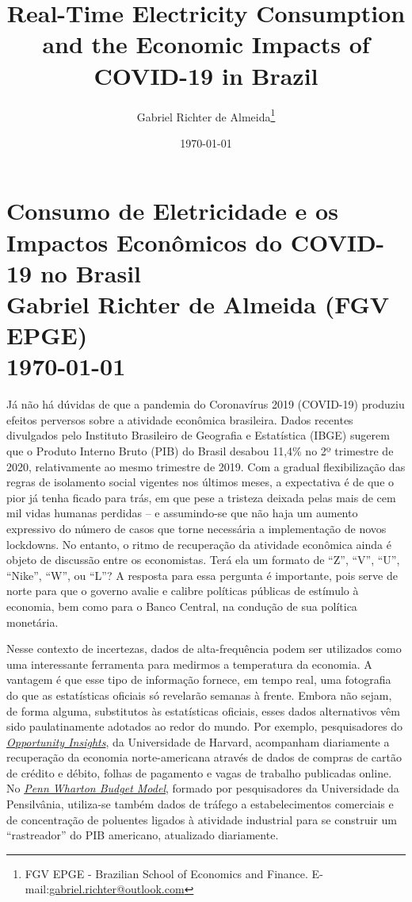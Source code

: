 \documentclass[12pt]{article}
\title{Real-Time Electricity Consumption and the Economic Impacts of COVID-19 in Brazil}
\author{Gabriel Richter de Almeida\footnote{FGV EPGE - Brazilian School of Economics and Finance. E-mail:\href{mailto:gabriel.richter@outlook.com}{gabriel.richter@outlook.com}}}
\date{\today}
\begin{document}
	
\section*{\normalsize Consumo de Eletricidade e os Impactos Econômicos do COVID-19 no Brasil \\	Gabriel Richter de Almeida (FGV EPGE) \\ \today}
	
Já não há dúvidas de que a pandemia do Coronavírus 2019 (COVID-19) produziu efeitos perversos sobre a atividade econômica brasileira. Dados recentes divulgados pelo Instituto Brasileiro de Geografia e Estatística (IBGE) sugerem que o Produto Interno Bruto (PIB) do Brasil desabou 11,4\% no 2º trimestre de 2020, relativamente ao mesmo trimestre de 2019. Com a gradual flexibilização das regras de isolamento social vigentes nos últimos meses, a expectativa é de que o pior já tenha ficado para trás, em que pese a tristeza deixada pelas mais de cem mil vidas humanas perdidas -- e assumindo-se que não haja um aumento expressivo do número de casos que torne necessária a implementação de novos lockdowns. No entanto, o ritmo de recuperação da atividade econômica ainda é objeto de discussão entre os economistas. Terá ela um formato de “Z”, “V”, “U”, “Nike”, “W”, ou “L”? A resposta para essa pergunta é importante, pois serve de norte para que o governo avalie e calibre políticas públicas de estímulo à economia, bem como para o Banco Central, na condução de sua política monetária.
	
Nesse contexto de incertezas, dados de alta-frequência podem ser utilizados como uma interessante ferramenta para medirmos a temperatura da economia. A vantagem é que esse tipo de informação fornece, em tempo real, uma fotografia do que as estatísticas oficiais só revelarão semanas à frente. Embora não sejam, de forma alguma, substitutos às estatísticas oficiais, esses dados alternativos vêm sido paulatinamente adotados ao redor do mundo. Por exemplo, pesquisadores do \href{https://opportunityinsights.org/}{\textit{Opportunity Insights}}, da Universidade de Harvard, acompanham diariamente a recuperação da economia norte-americana através de dados de compras de cartão de crédito e débito, folhas de pagamento e vagas de trabalho publicadas online. No \href{https://budgetmodel.wharton.upenn.edu/}{\textit{Penn Wharton Budget Model}}, formado por pesquisadores da Universidade da Pensilvânia, utiliza-se também dados de tráfego a estabelecimentos comerciais e de concentração de poluentes ligados à atividade industrial para se construir um ``rastreador'' do PIB americano, atualizado diariamente. \vspace{5pt}
	
\end{document}
